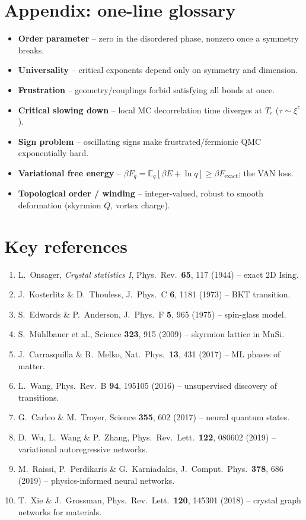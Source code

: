 \documentclass[11pt]{article}
\begin{document}
\section*{Appendix: one-line glossary}
\small
\begin{itemize}
\item \textbf{Order parameter} -- zero in the disordered phase, nonzero once a symmetry breaks.
\item \textbf{Universality} -- critical exponents depend only on symmetry and dimension.
\item \textbf{Frustration} -- geometry/couplings forbid satisfying all bonds at once.
\item \textbf{Critical slowing down} -- local MC decorrelation time diverges at $T_c$ ($\tau\sim\xi^z$).
\item \textbf{Sign problem} -- oscillating signs make frustrated/fermionic QMC exponentially hard.
\item \textbf{Variational free energy} -- $\beta F_q=\mathbb{E}_q[\beta E+\ln q]\ge\beta F_{\text{exact}}$; the VAN loss.
\item \textbf{Topological order / winding} -- integer-valued, robust to smooth deformation (skyrmion $Q$, vortex charge).
\end{itemize}

\section*{Key references}
\small
\begin{enumerate}[itemsep=1pt]
\item L.\ Onsager, \emph{Crystal statistics I}, Phys.\ Rev.\ \textbf{65}, 117 (1944) -- exact 2D Ising.
\item J.\ Kosterlitz \& D.\ Thouless, J.\ Phys.\ C \textbf{6}, 1181 (1973) -- BKT transition.
\item S.\ Edwards \& P.\ Anderson, J.\ Phys.\ F \textbf{5}, 965 (1975) -- spin-glass model.
\item S.\ M\"uhlbauer et al., Science \textbf{323}, 915 (2009) -- skyrmion lattice in MnSi.
\item J.\ Carrasquilla \& R.\ Melko, Nat.\ Phys.\ \textbf{13}, 431 (2017) -- ML phases of matter.
\item L.\ Wang, Phys.\ Rev.\ B \textbf{94}, 195105 (2016) -- unsupervised discovery of transitions.
\item G.\ Carleo \& M.\ Troyer, Science \textbf{355}, 602 (2017) -- neural quantum states.
\item D.\ Wu, L.\ Wang \& P.\ Zhang, Phys.\ Rev.\ Lett.\ \textbf{122}, 080602 (2019) -- variational autoregressive networks.
\item M.\ Raissi, P.\ Perdikaris \& G.\ Karniadakis, J.\ Comput.\ Phys.\ \textbf{378}, 686 (2019) -- physics-informed neural networks.
\item T.\ Xie \& J.\ Grossman, Phys.\ Rev.\ Lett.\ \textbf{120}, 145301 (2018) -- crystal graph networks for materials.
\end{enumerate}
\end{document}
